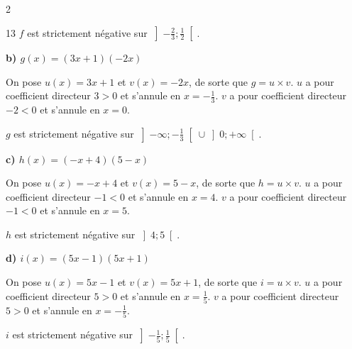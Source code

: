 \documentclass[10pt,a4paper]{article}
\begin{document}
\begin{multicols}{2}
\begin{corr}{13}
\(f\) est strictement négative sur \(\left]-\frac{2}{3};\frac{1}{2}\right[\).

\bigskip

\textbf{b) \(g(x)=(3x+1)(-2x)\)}

On pose \(u(x)=3x+1\) et \(v(x)=-2x\), de sorte que \(g=u\times v\). \(u\) a pour coefficient directeur \(3>0\) et s'annule en \(x=-\frac{1}{3}\). \(v\) a pour coefficient directeur \(-2<0\) et s'annule en \(x=0\).

\begin{center}
\end{center}

\(g\) est strictement négative sur \(\left]-\infty;-\frac{1}{3}\right[\cup\left]0;+\infty\right[\).

\bigskip

\textbf{c) \(h(x)=(-x+4)(5-x)\)}

On pose \(u(x)=-x+4\) et \(v(x)=5-x\), de sorte que \(h=u\times v\). \(u\) a pour coefficient directeur \(-1<0\) et s'annule en \(x=4\). \(v\) a pour coefficient directeur \(-1<0\) et s'annule en \(x=5\).

\begin{center}
\end{center}

\(h\) est strictement négative sur \(\left]4;5\right[\).

\bigskip

\textbf{d) \(i(x)=(5x-1)(5x+1)\)}

On pose \(u(x)=5x-1\) et \(v(x)=5x+1\), de sorte que \(i=u\times v\). \(u\) a pour coefficient directeur \(5>0\) et s'annule en \(x=\frac{1}{5}\). \(v\) a pour coefficient directeur \(5>0\) et s'annule en \(x=-\frac{1}{5}\).

\begin{center}
\end{center}

\(i\) est strictement négative sur \(\left]-\frac{1}{5};\frac{1}{5}\right[\).

\end{corr}

\end{multicols}
\end{document}
